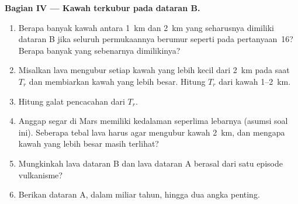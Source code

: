 \begin{problem}
\medskip\noindent\textbf{Bagian IV --- Kawah terkubur pada dataran B.}
\begin{enumerate}[resume]
\item Berapa banyak kawah antara \qty{1}{km} dan \qty{2}{km} yang seharusnya dimiliki dataran B jika
  seluruh permukaannya berumur seperti pada pertanyaan~16? Berapa banyak yang sebenarnya dimilikinya?
\item Misalkan lava mengubur setiap kawah yang lebih kecil dari \qty{2}{km} pada
  saat $T_r$ dan membiarkan kawah yang lebih besar. Hitung $T_r$ dari
  kawah \num{1}--\qty{2}{km}.
\item Hitung galat pencacahan dari $T_r$.
\item Anggap  segar di Mars memiliki kedalaman seperlima
  lebarnya (asumsi soal ini). Seberapa tebal lava harus agar mengubur
  kawah \qty{2}{km}, dan mengapa kawah yang lebih besar masih terlihat?
\item Mungkinkah lava dataran B dan lava dataran A berasal dari satu episode
  vulkanisme?
\item Berikan  dataran A, dalam miliar tahun, hingga dua
  angka penting.
\end{enumerate}
\end{problem}
